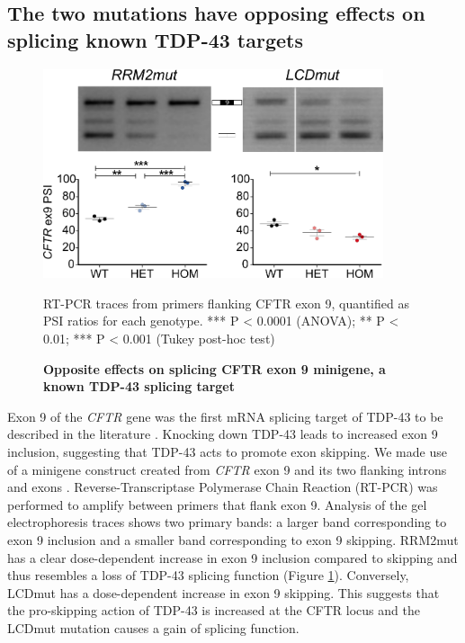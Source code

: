 \subsection{The two mutations have opposing effects on splicing known TDP-43 targets}

\begin{figure}[h!]
	\centering
	\includegraphics[width=10cm]{Figures/05_tdp_mice/CFTR.png}
	\caption{\textbf{Opposite effects on splicing CFTR exon 9 minigene, a known TDP-43 splicing target}}
	RT-PCR traces from primers flanking CFTR exon 9, quantified as PSI ratios for each genotype. *** P < 0.0001 (ANOVA); ** P < 0.01; *** P < 0.001 (Tukey post-hoc test)	
	\label{fig:CFTR}
\end{figure}

Exon 9 of the \textit{CFTR} gene was the first mRNA splicing target of TDP-43 to be described in the literature \citep{Buratti2001-et}. Knocking down TDP-43 leads to increased exon 9 inclusion, suggesting that TDP-43 acts to promote exon skipping. 
We made use of a minigene construct created from \textit{CFTR} exon 9 and its two flanking introns and exons \citep{Buratti2007minigene}.
Reverse-Transcriptase Polymerase Chain Reaction (RT-PCR) was performed to amplify between primers that flank exon 9. 
Analysis of the gel electrophoresis traces shows two primary bands: a larger band corresponding to exon 9 inclusion and a smaller band corresponding to exon 9 skipping. 
RRM2mut has a clear dose-dependent increase in exon 9 inclusion compared to skipping and thus resembles a loss of TDP-43 splicing function (Figure  \ref{fig:CFTR}). 
Conversely, LCDmut has a dose-dependent increase in exon 9 skipping.
This suggests that the pro-skipping action of TDP-43 is increased at the CFTR locus and the LCDmut mutation causes a gain of splicing function.

